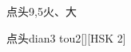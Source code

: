 \begin{entry}{点头}{9,5}{⽕、⼤}
  \begin{phonetics}{点头}{dian3 tou2}[][HSK 2]
  \end{phonetics}
\end{entry}
